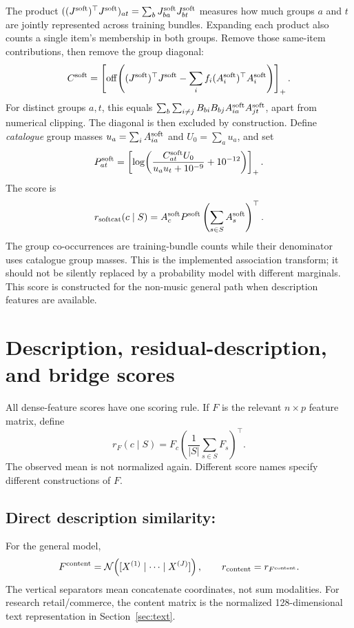 \documentclass[11pt,a4paper]{article}
\newcommand{\pos}[1]{\left[#1\right]_{+}}
\newcommand{\off}{\operatorname{off}}
\newcommand{\rn}{\mathcal N}
\DeclareRobustCommand{\key}[1]{\texttt{\detokenize{#1}}}
\begin{document}
The product $((J^{\rm soft})^\top J^{\rm soft})_{at}
=\sum_bJ^{\rm soft}_{ba}J^{\rm soft}_{bt}$ measures how much groups $a$ and
$t$ are jointly represented across training bundles. Expanding each product
also counts a single item's membership in both groups. Remove those
same-item contributions, then remove the group diagonal:
\begin{equation}
 C^{\rm soft}=\pos{\off\!\left(
 (J^{\rm soft})^\top J^{\rm soft}
 -\sum_i f_i(A^{\rm soft}_i)^\top A^{\rm soft}_i\right)}.
\end{equation}
For distinct groups $a,t$, this equals
$\sum_b\sum_{i\ne j}B_{bi}B_{bj}A^{\rm soft}_{ia}A^{\rm soft}_{jt}$,
apart from numerical clipping. The diagonal is then excluded by construction.
Define \emph{catalogue} group masses $u_a=\sum_iA^{\rm soft}_{ia}$ and
$U_0=\sum_au_a$, and set
\begin{equation}
 P^{\rm soft}_{at}=\pos{\log\!\left(
 \frac{C^{\rm soft}_{at}U_0}{u_au_t+10^{-9}}+10^{-12}\right)}.
\end{equation}
The score is
\begin{equation}
 r_{\rm softcat}(c\mid S)=A^{\rm soft}_cP^{\rm soft}
 \left(\sum_{s\in S}A^{\rm soft}_s\right)^\top.
\end{equation}
The group co-occurrences are training-bundle counts while their denominator
uses catalogue group masses. This is the implemented association transform;
it should not be silently replaced by a probability model with different
marginals. This score is constructed for the non-music general path when
description features are available.

\section{Description, residual-description, and bridge scores}

All dense-feature scores have one scoring rule. If $F$ is the relevant
$n\times p$ feature matrix, define
\begin{equation}\label{eq:feature}
 r_F(c\mid S)=F_c\left(\frac1{|S|}\sum_{s\in S}F_s\right)^\top.
\end{equation}
The observed mean is not normalized again. Different score names specify
different constructions of $F$.

\subsection{Direct description similarity: \key{content}}
For the general model,
\[
 F^{\rm content}=\rn\!\left([X^{(1)}\mid\cdots\mid X^{(J)}]\right),\qquad
 r_{\rm content}=r_{F^{\rm content}}.
\]
The vertical separators mean concatenate coordinates, not sum modalities.
For research retail/commerce, the content matrix is the normalized
128-dimensional text representation in Section~\ref{sec:text}.
\end{document}
